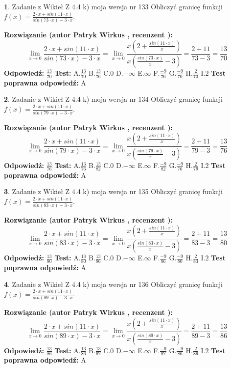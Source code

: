 \documentclass[12pt, a4paper]{article}
\theoremstyle{definition} %
\newtheorem{zad}{}
\newcommand{\zadStart}[1]{\begin{zad}#1\newline}
\newcommand{\zadStop}{\end{zad}}
\newcommand{\rozwStart}[2]{\noindent \textbf{Rozwiązanie (autor #1 , recenzent #2): }\newline}
\newcommand{\rozwStop}{\newline}
\newcommand{\odpStart}{\noindent \textbf{Odpowiedź:}\newline}
\newcommand{\odpStop}{\newline}
\newcommand{\testStart}{\noindent \textbf{Test:}\newline}
\newcommand{\testStop}{\newline}
\newcommand{\kluczStart}{\noindent \textbf{Test poprawna odpowiedź:}\newline}
\newcommand{\kluczStop}{\newline}
\begin{document}
\zadStart{Zadanie z Wikieł Z 4.4 k) moja wersja nr 133}
Obliczyć granicę funkcji $f(x)=\frac{2\cdot x +sin(11\cdot x)}{sin(73\cdot x) -3\cdot x}$.
\zadStop
\rozwStart{Patryk Wirkus}{}
$$\lim\limits_{x\to 0}\frac{2\cdot x +sin(11\cdot x)}{sin(73\cdot x) -3\cdot x}
=\lim\limits_{x\to 0}\frac{x(2+\frac{sin(11\cdot x)}{x})}{x(\frac{sin(73\cdot x)}{x}-3)}
=\frac{2+11}{73-3} = \frac{13}{70}$$
\rozwStop
\odpStart
$\frac{13}{70}$
\odpStop
\testStart
A.$\frac{13}{70}$
B.$\frac{13}{76}$
C.$0$
D.$-\infty$
E.$\infty$
F.$\frac{-9}{76}$
G.$\frac{-9}{70}$
H.$\frac{2}{73}$
I.$2$
\testStop
\kluczStart
A
\kluczStop



\zadStart{Zadanie z Wikieł Z 4.4 k) moja wersja nr 134}
Obliczyć granicę funkcji $f(x)=\frac{2\cdot x +sin(11\cdot x)}{sin(79\cdot x) -3\cdot x}$.
\zadStop
\rozwStart{Patryk Wirkus}{}
$$\lim\limits_{x\to 0}\frac{2\cdot x +sin(11\cdot x)}{sin(79\cdot x) -3\cdot x}
=\lim\limits_{x\to 0}\frac{x(2+\frac{sin(11\cdot x)}{x})}{x(\frac{sin(79\cdot x)}{x}-3)}
=\frac{2+11}{79-3} = \frac{13}{76}$$
\rozwStop
\odpStart
$\frac{13}{76}$
\odpStop
\testStart
A.$\frac{13}{76}$
B.$\frac{13}{82}$
C.$0$
D.$-\infty$
E.$\infty$
F.$\frac{-9}{82}$
G.$\frac{-9}{76}$
H.$\frac{2}{79}$
I.$2$
\testStop
\kluczStart
A
\kluczStop



\zadStart{Zadanie z Wikieł Z 4.4 k) moja wersja nr 135}
Obliczyć granicę funkcji $f(x)=\frac{2\cdot x +sin(11\cdot x)}{sin(83\cdot x) -3\cdot x}$.
\zadStop
\rozwStart{Patryk Wirkus}{}
$$\lim\limits_{x\to 0}\frac{2\cdot x +sin(11\cdot x)}{sin(83\cdot x) -3\cdot x}
=\lim\limits_{x\to 0}\frac{x(2+\frac{sin(11\cdot x)}{x})}{x(\frac{sin(83\cdot x)}{x}-3)}
=\frac{2+11}{83-3} = \frac{13}{80}$$
\rozwStop
\odpStart
$\frac{13}{80}$
\odpStop
\testStart
A.$\frac{13}{80}$
B.$\frac{13}{86}$
C.$0$
D.$-\infty$
E.$\infty$
F.$\frac{-9}{86}$
G.$\frac{-9}{80}$
H.$\frac{2}{83}$
I.$2$
\testStop
\kluczStart
A
\kluczStop



\zadStart{Zadanie z Wikieł Z 4.4 k) moja wersja nr 136}
Obliczyć granicę funkcji $f(x)=\frac{2\cdot x +sin(11\cdot x)}{sin(89\cdot x) -3\cdot x}$.
\zadStop
\rozwStart{Patryk Wirkus}{}
$$\lim\limits_{x\to 0}\frac{2\cdot x +sin(11\cdot x)}{sin(89\cdot x) -3\cdot x}
=\lim\limits_{x\to 0}\frac{x(2+\frac{sin(11\cdot x)}{x})}{x(\frac{sin(89\cdot x)}{x}-3)}
=\frac{2+11}{89-3} = \frac{13}{86}$$
\rozwStop
\odpStart
$\frac{13}{86}$
\odpStop
\testStart
A.$\frac{13}{86}$
B.$\frac{13}{92}$
C.$0$
D.$-\infty$
E.$\infty$
F.$\frac{-9}{92}$
G.$\frac{-9}{86}$
H.$\frac{2}{89}$
I.$2$
\testStop
\kluczStart
A
\kluczStop
\end{document}
